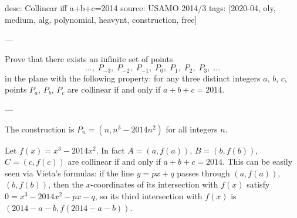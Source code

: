 desc: Collinear iff a+b+c=2014
source: USAMO 2014/3
tags: [2020-04, oly, medium, alg, polynomial, heavynt, construction, free]

---

Prove that there exists an infinite set of points \[\ldots,\;P_{-3},\;P_{-2},\;P_{-1},\;P_0,\;P_1,\;P_2,\;P_3,\;\ldots\]
in the plane with the following property: for any three distinct integers $a$, $b$, $c$, points $P_a$, $P_b$, $P_c$ are collinear if and only if $a+b+c=2014$.

---

The construction is $P_n=\left(n,n^3-2014n^2\right)$ for all integers $n$.

Let $f(x)=x^3-2014x^2$. In fact $A=(a,f(a))$, $B=(b,f(b))$, $C=(c,f(c))$ are collinear if and only if $a+b+c=2014$. This can be easily seen via Vieta's formulas: if the line $y=px+q$ passes through $(a,f(a))$, $(b,f(b))$, then the $x$-coordinates of its intersection with $f(x)$ satisfy $0=x^3-2014x^2-px-q$, so its third intersection with $f(x)$ is $(2014-a-b,f(2014-a-b))$. 

